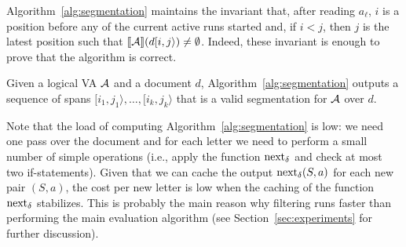 Algorithm~\ref{alg:segmentation} maintains the invariant that, after reading $a_\ell$, $i$ is a position before any of the current active runs started and, if $i < j$,  then $j$ is the latest position such that $\llbracket\mathcal{A}\rrbracket(d[i, j\rangle) \neq \emptyset$. Indeed, these invariant is enough to prove that the algorithm is correct.
\begin{theorem}\label{theo:segmentation}
	Given a logical VA $\mathcal{A}$ and a document $d$, Algorithm~\ref{alg:segmentation} outputs a sequence of spans $[i_1, j_1\rangle, \ldots, [i_k, j_k\rangle$ that is a valid segmentation for $\mathcal{A}$ over $d$.
\end{theorem}

Note that the load of computing Algorithm~\ref{alg:segmentation} is low: we need one pass over the document and for each letter we need to perform a small number of simple operations (i.e., apply the function $\operatorname{next}_{\delta}$ and check at most two if-statements). Given that we can cache the output $\operatorname{next}_{\delta}(S, a)$ for each new pair $(S, a)$, the cost per new letter is low when the caching of the function $\operatorname{next}_{\delta}$ stabilizes. This is probably the main reason why filtering runs faster   than performing the main evaluation algorithm (see Section~\ref{sec:experiments} for further discussion).


